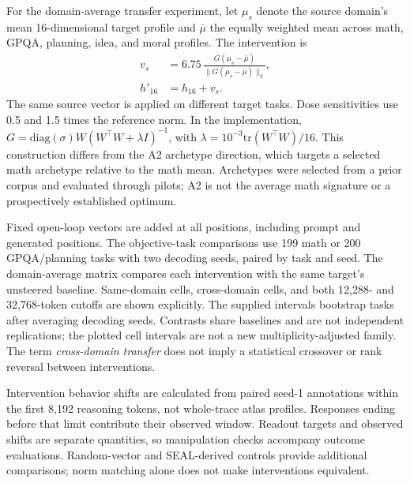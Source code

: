 For the domain-average transfer experiment, let $\mu_s$ denote the source domain's mean 16-dimensional target profile and $\bar\mu$ the equally weighted mean across math, GPQA, planning, idea, and moral profiles. The intervention is
\begin{equation}
\begin{aligned}
v_s&=6.75\,\frac{G(\mu_s-\bar\mu)}{\|G(\mu_s-\bar\mu)\|_2},\\
h'_{16}&=h_{16}+v_s.
\end{aligned}
\end{equation}
The same source vector is applied on different target tasks. Dose sensitivities use 0.5 and 1.5 times the reference norm. In the implementation, $G=\mathrm{diag}(\sigma)W(W^\top W+\lambda I)^{-1}$, with $\lambda=10^{-3}\mathrm{tr}(W^\top W)/16$. This construction differs from the A2 archetype direction, which targets a selected math archetype relative to the math mean. Archetypes were selected from a prior corpus and evaluated through pilots; A2 is not the average math signature or a prospectively established optimum.

Fixed open-loop vectors are added at all positions, including prompt and generated positions. The objective-task comparisons use 199 math or 200 GPQA/planning tasks with two decoding seeds, paired by task and seed. The domain-average matrix compares each intervention with the same target's unsteered baseline. Same-domain cells, cross-domain cells, and both 12,288- and 32,768-token cutoffs are shown explicitly. The supplied intervals bootstrap tasks after averaging decoding seeds. Contrasts share baselines and are not independent replications; the plotted cell intervals are not a new multiplicity-adjusted family. The term \emph{cross-domain transfer} does not imply a statistical crossover or rank reversal between interventions.

Intervention behavior shifts are calculated from paired seed-1 annotations within the first 8,192 reasoning tokens, not whole-trace atlas profiles. Responses ending before that limit contribute their observed window. Readout targets and observed shifts are separate quantities, so manipulation checks accompany outcome evaluations. Random-vector and SEAL-derived controls provide additional comparisons; norm matching alone does not make interventions equivalent.


